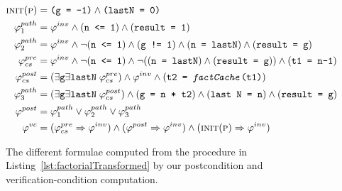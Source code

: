 \begin{figure}
\begin{align*}
\textsc{init}(\textsc{p}) &= \texttt{(g = -1)} \wedge \texttt{(lastN = 0)} \\
\varphi^{path}_1 &= \varphi^{inv} \wedge (\texttt{n <= 1}) \wedge (\texttt{result = 1}) \\
\varphi^{path}_2 &= \varphi^{inv} \wedge \neg(\texttt{n <= 1}) \wedge (\texttt{g != 1}) \wedge (\texttt{n = lastN}) \wedge (\texttt{result = g}) \\
\varphi^{pre}_{cs} &= \varphi^{inv} \wedge \neg(\texttt{n <= 1}) \wedge \neg((\texttt{n = lastN}) \wedge (\texttt{result = g})) \wedge (\texttt{t1 = n-1}) \\
\varphi^{post}_{cs} &= (\exists \texttt{g} \exists \texttt{lastN} \; \varphi^{pre}_{cs}) \wedge \varphi^{inv} \wedge (\texttt{t2 = \emph{factCache}(t1)}) \\
\varphi^{path}_3 &= (\exists \texttt{g} \exists \texttt{lastN} \; \varphi^{post}_{cs}) \wedge (\texttt{g = n * t2}) \wedge (\texttt{last N = n}) \wedge (\texttt{result = g}) \\
\varphi^{post} &= \varphi^{path}_1 \vee \varphi^{path}_2 \vee \varphi^{path}_3 \\
\varphi^{vc} &= (\varphi^{pre}_{cs} \Rightarrow \varphi^{inv}) \wedge (\varphi^{post} \Rightarrow \varphi^{inv}) \wedge (\textsc{init}(\textsc{p}) \Rightarrow \varphi^{inv})
\end{align*}
\caption{
The different formulae computed from the procedure in Listing~\ref{lst:factorialTransformed} 
by our postcondition and verification-condition computation.
}
\label{fig:pathCondition}
\end{figure}

